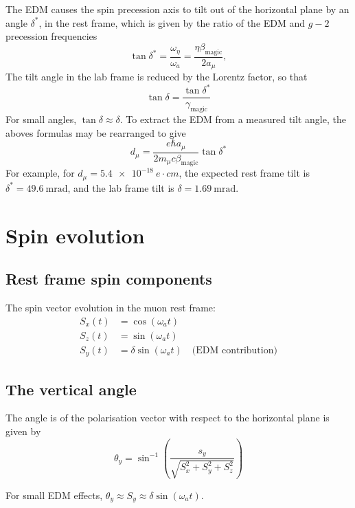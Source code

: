 \documentclass[11pt]{article}
\begin{document}
The EDM causes the spin precession axis to tilt out of the horizontal plane by an angle $\delta^{*}$, in the rest frame, which is given by the ratio of the EDM and $g-2$ precession frequencies
%
\begin{equation}
\tan \delta^{*} = \frac{\omega_\eta}{\omega_a} = \frac{\eta \beta_{\text{magic}}} { 2 a_\mu },
\end{equation}  
%
The tilt angle in the lab frame is reduced by the Lorentz factor, so that
%
\begin{equation}
\tan \delta = \frac{\tan \delta^{*}}{\gamma_{\text{magic}}} 
\end{equation}
%
For small angles, $\tan \delta \approx \delta$.
% 
To extract the EDM from a measured tilt angle, the aboves formulas may be rearranged to give
%
\begin{equation}
    \boxed{d_\mu = \frac{e \hbar a_\mu}{2 m_\mu c \beta_{\text{magic}}} \tan \delta^{*}}
\end{equation}
%
For example, for $d_\mu = \SI{5.4e-18}{e \cdot cm}$, the expected rest frame tilt is $\delta^{*} = \SI{49.6}{\milli\radian}$, and the lab frame tilt is $\delta = \SI{1.69}{\milli\radian}$.

\section{Spin evolution}

\subsection{Rest frame spin components}
%
The spin vector evolution in the muon rest frame:
\begin{align}
S_x(t) &= \cos(\omega_a t) \\
S_z(t) &= \sin(\omega_a t) \\
S_y(t) &= \delta \sin(\omega_a t) \quad \text{(EDM contribution)}
\end{align}
%

\subsection{The vertical angle}
%
The angle is of the polarisation vector with respect to the horizontal plane is given by
\begin{equation}
\theta_y = \sin^{-1}\left(\frac{s_y}{\sqrt{S_x^2 + S_y^2 + S_z^2}}\right)
\end{equation}

For small EDM effects, $\theta_y \approx S_y \approx \delta \sin(\omega_a t)$.
\end{document}

